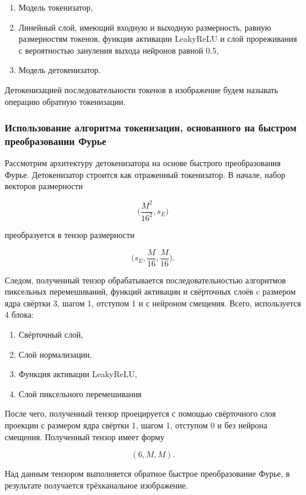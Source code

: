 \begin{enumerate}
    \item Модель токенизатор,
    \item Линейный слой, имеющий входную и выходную размерность, равную размерностям токенов, функция активации LeakyReLU и слой прореживания с вероятностью зануления выхода нейронов равной 0.5,
    \item Модель детокенизатор.
\end{enumerate}

Детокенизацией последовательности токенов в изображение будем называть операцию обратную токенизации.

\subsubsection{Использование алгоритма токенизации, основанного на быстром преобразовании Фурье}

Рассмотрим архитектуру детокенизатора на основе быстрого преобразования Фурье. Детокенизатор строится как отраженный токенизатор. В начале, набор векторов размерности

$$
\Big(\dfrac{M^2}{16^2}, s_E\Big)
$$

преобразуется в тензор размерности

$$
\Big(s_E, \dfrac{M}{16}, \dfrac{M}{16}\Big).
$$

Следом,  полученный тензор обрабатывается последовательностью алгоритмов пиксельных перемешиваний, функций активации и свёрточных слоёв c размером ядра свёртки 3, шагом 1, отступом 1 и с нейроном смещения. Всего, используется 4 блока:

\begin{enumerate}
    \item Свёрточный слой,
    \item Слой нормализации,
    \item Функция активации LeakyReLU,
    \item Слой пиксельного перемешивания
\end{enumerate}

После чего, полученный тензор проецируется с помощью свёрточного слоя проекции с размером ядра свёртки 1, шагом 1, отступом 0 и без нейрона смещения. Полученный тензор имеет форму

$$
(6, M, M).
$$

Над данным тензором выполняется обратное быстрое преобразование Фурье, в результате получается трёхканальное изображение. 


